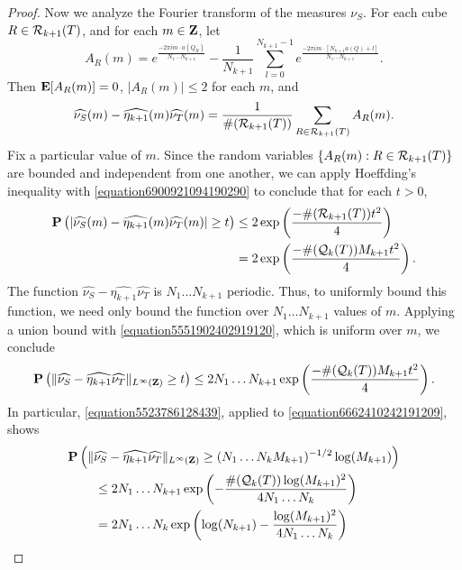 \begin{proof}
    Now we analyze the Fourier transform of the measures $\nu_S$. For each cube $R \in \operatorname{\mathcal{R}}_{k+1}(T)$, and for each $m \in \operatorname{\mathbf{Z}}$, let
    \[ A_R(m) = e^{\frac{-2 \pi i m \cdot a(Q_R)}{N_1 \dots N_{k+1}}} - \frac{1}{N_{k+1}} \sum_{l = 0}^{N_{k+1} - 1} e^{\frac{-2 \pi i m \cdot [N_{k+1} a(Q) + l]}{N_1 \dots N_{k+1}}}. \]
    Then $\operatorname{\mathbf{E}}[A_R(m)] = 0$, $|A_R(m)| \leq 2$ for each $m$, and
    \[ \widehat{\nu_S}(m) - \widehat{\eta_{k+1}}(m) \widehat{\nu_T}(m) = \frac{1}{\#(\operatorname{\mathcal{R}}_{k+1}(T))} \sum_{R \in \operatorname{\mathcal{R}}_{k+1}(T)} A_R(m). \]
    Fix a particular value of $m$. Since the random variables $\{ A_R(m) : R \in \operatorname{\mathcal{R}}_{k+1}(T) \}$ are bounded and independent from one another, we can apply Hoeffding's inequality with \eqref{equation6900921094190290} to conclude that for each $t > 0$,
    \begin{equation} \label{equation5551902402919120}
    \begin{split}
        \operatorname{\mathbf{P}} \left( |\widehat{\nu_S}(m) - \widehat{\eta_{k+1}}(m) \widehat{\nu_T}(m)| \geq t \right) &\leq 2 \exp \left( \frac{- \#(\operatorname{\mathcal{R}}_{k+1}(T)) t^2}{4} \right)\\
        &= 2 \exp \left( \frac{- \#(\operatorname{\mathcal{Q}}_k(T)) M_{k+1} t^2}{4} \right).
    \end{split}
    \end{equation}
    The function $\widehat{\nu_S} - \widehat{\eta_{k+1}} \widehat{\nu_T}$ is $N_1 \dots N_{k+1}$ periodic. Thus, to uniformly bound this function, we need only bound the function over $N_1 \dots N_{k+1}$ values of $m$. Applying a union bound with \eqref{equation5551902402919120}, which is uniform over $m$, we conclude
    \begin{equation} \label{equation6662410242191209}
        \operatorname{\mathbf{P}} \left( \| \widehat{\nu_S} - \widehat{\eta_{k+1}} \widehat{\nu_T} \|_{L^\infty(\operatorname{\mathbf{Z}})} \geq t \right) \leq 2 N_1 \dots N_{k+1} \exp \left( \frac{- \#(\operatorname{\mathcal{Q}}_k(T)) M_{k+1} t^2}{4} \right).
    \end{equation}
    In particular, \eqref{equation5523786128439}, applied to \eqref{equation6662410242191209}, shows
    \begin{align*}
        \PP & \left( \| \widehat{\nu_S} - \widehat{\eta_{k+1}} \widehat{\nu_T} \|_{L^\infty(\ZZ)} \geq (N_1 \dots N_k M_{k+1})^{-1/2} \log(M_{k+1}) \right)\\
        &\ \ \ \ \leq 2N_1 \dots N_{k+1} \exp \left( - \frac{\#(\DQ_k(T)) \log(M_{k+1})^2}{4 N_1 \dots N_k} \right)\\
        &\ \ \ \ = 2 N_1 \dots N_k \exp \left( \log(N_{k+1}) - \frac{\log(M_{k+1})^2}{4 N_1 \dots N_k} \right)\\

\end{align*}
\end{proof}
